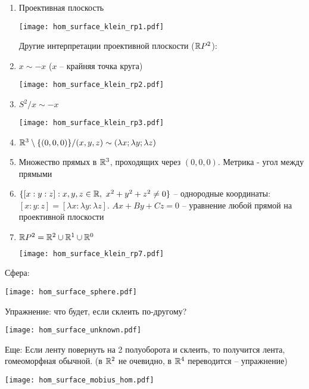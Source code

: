 \documentclass[main]{subfiles}
\begin{document}
\begin{enumerate}
    \item Проективная плоскость
          \begin{center}
              \texttt{[image: hom\_surface\_klein\_rp1.pdf]}
          \end{center}
          Другие интерпретации проективной плоскости ($\mathbb{R} P^2$):
    \item $x \sim -x$ ($x$ -- крайняя точка круга)
          \begin{center}
              \texttt{[image: hom\_surface\_klein\_rp2.pdf]}
          \end{center}
    \item $S^2/ x\sim -x$
          \begin{center}
              \texttt{[image: hom\_surface\_klein\_rp3.pdf]}
          \end{center}
    \item $\mathbb{R}^3 \setminus \{(0,0,0)\} / (x,y,z) \sim (\lambda x; \lambda y; \lambda z)$
    \item Множество прямых в $\mathbb{R}^3$, проходящих через $(0,0,0)$. Метрика - угол между прямыми
    \item $\{[x:y:z] : x,y,z \in \mathbb{R},\ x^2 + y^2 + z^2 \neq 0\}$ -- однородные координаты: $[x:y:z] = [\lambda x: \lambda y: \lambda z]$.
          $Ax + By + Cz = 0$ -- уравнение любой прямой на проективной плоскости
    \item $\mathbb{R} P^2 = \mathbb{R}^2 \cup \mathbb{R}^1 \cup \mathbb{R}^0$
          \begin{center}
              \texttt{[image: hom\_surface\_klein\_rp7.pdf]}
          \end{center}
\end{enumerate}

Сфера:
\begin{center}
    \texttt{[image: hom\_surface\_sphere.pdf]}
\end{center}
Упражнение: что будет, если склеить по-другому?
\begin{center}
    \texttt{[image: hom\_surface\_unknown.pdf]}
\end{center}
Еще: Если ленту повернуть на 2 полуоборота и склеить, то получится лента, гомеоморфная обычной.
(в $\mathbb{R}^2$ не очевидно, в $\mathbb{R}^4$ переводится -- упражнение)
\begin{center}
    \texttt{[image: hom\_surface\_mobius\_hom.pdf]}
\end{center}
\end{document}
